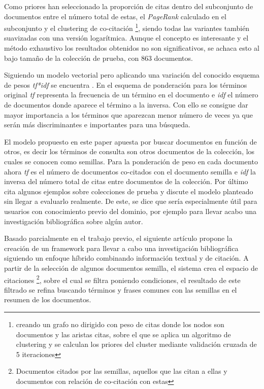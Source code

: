 Como priores han seleccionado la proporción de citas dentro del subconjunto de documentos entre el número total de estas, el \textit{PageRank} calculado en el subconjunto y el clustering de co-citación \footnote{creando un grafo no dirigido con peso de citas donde los nodos son documentos y las aristas citas, sobre el que se aplica un algoritmo de clustering y se calculan los priores del cluster mediante validación cruzada de 5 iteraciones}, siendo todas las variantes también suavizadas con una versión logarítmica. Aunque el concepto es interesante y el método exhaustivo los resultados obtenidos no son significativos, se achaca esto al bajo tamaño de la colección de prueba, con 863 documentos.

Siguiendo un modelo vectorial pero aplicando una variación del conocido esquema de pesos \textit{tf*idf} se encuentra \cite{DBLP:conf/ecir/White16}. En el esquema de ponderación para los términos original \textit{tf} representa la frecuencia de un término en el documento e \textit{idf} el número de documentos donde aparece el término a la inversa. Con ello se consigue dar mayor importancia a los términos que aparezcan menor número de veces ya que serán más discriminantes e importantes para una búsqueda.

El modelo propuesto en este paper apuesta por buscar documentos en función de otros, es decir los términos de consulta son otros documentos de la colección, los cuales se conocen como semillas. Para la ponderación de peso en cada documento ahora \textit{tf} es el número de documentos co-citados con el documento semilla e \textit{idf} la inversa del número total de citas entre documentos de la colección. Por último cita algunos ejemplos sobre colecciones de prueba y discute el modelo planteado sin llegar a evaluarlo realmente. De este, se dice que sería especialmente útil para usuarios con conocimiento previo del dominio, por ejemplo para llevar acabo una investigación bibliográfica sobre algún autor.

Basado parcialmente en el trabajo previo, el siguiente artículo \cite{DBLP:conf/ecir/SarolLS18} propone la creación de un \gls{framework}  para llevar a cabo una investigación bibliográfica siguiendo un enfoque híbrido combinando información textual y de citación. A partir de la selección de algunos documentos semilla, el sistema crea el espacio de citaciones \footnote{Documentos citados por las semillas, aquellos que las citan a ellas y documentos con relación de co-citación con estas}, sobre el cual se filtra poniendo condiciones, el resultado de este filtrado se refina buscando términos y frases comunes con las semillas en el resumen de los documentos. 

